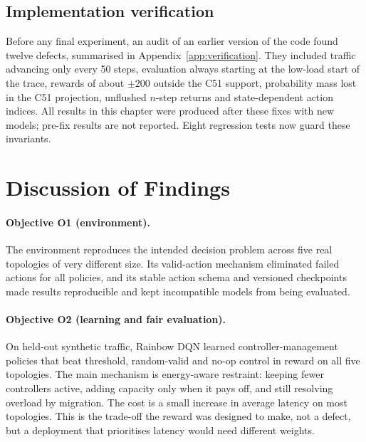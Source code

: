 \subsection{Implementation verification}

Before any final experiment, an audit of an earlier version of the code found twelve defects, summarised in Appendix~\ref{app:verification}. They included traffic advancing only every 50 steps, evaluation always starting at the low-load start of the trace, rewards of about $\pm200$ outside the C51 support, probability mass lost in the C51 projection, unflushed $n$-step returns and state-dependent action indices. All results in this chapter were produced after these fixes with new models; pre-fix results are not reported. Eight regression tests now guard these invariants.

\section{Discussion of Findings}
\label{sec:discussion}

\paragraph{Objective O1 (environment).} The environment reproduces the intended decision problem across five real topologies of very different size. Its valid-action mechanism eliminated failed actions for all policies, and its stable action schema and versioned checkpoints made results reproducible and kept incompatible models from being evaluated.

\paragraph{Objective O2 (learning and fair evaluation).} On held-out synthetic traffic, Rainbow DQN learned controller-management policies that beat threshold, random-valid and no-op control in reward on all five topologies. The main mechanism is energy-aware restraint: keeping fewer controllers active, adding capacity only when it pays off, and still resolving overload by migration. The cost is a small increase in average latency on most topologies. This is the trade-off the reward was designed to make, not a defect, but a deployment that prioritises latency would need different weights.

